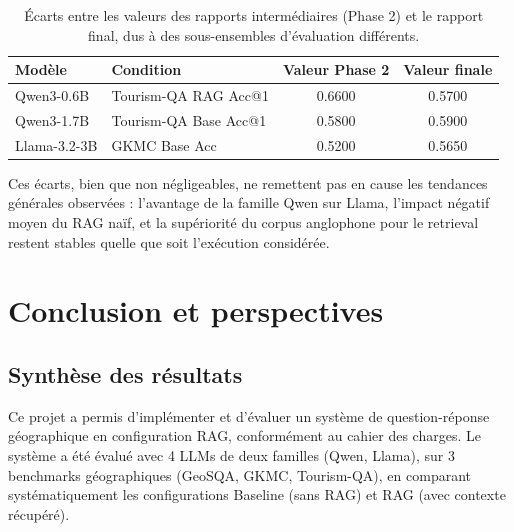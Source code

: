 \documentclass[12pt,a4paper]{article}
\begin{document}
\begin{table}[H]
\centering
\caption{Écarts entre les valeurs des rapports intermédiaires (Phase 2) et 
le rapport final, dus à des sous-ensembles d'évaluation différents.}
\label{tab:repro}
\begin{tabular}{llcc}
\toprule
\textbf{Modèle} & \textbf{Condition} & 
\textbf{Valeur Phase 2} & \textbf{Valeur finale} \\
\midrule
Qwen3-0.6B   & Tourism-QA RAG Acc@1  & 0.6600 & 0.5700 \\
Qwen3-1.7B   & Tourism-QA Base Acc@1 & 0.5800 & 0.5900 \\
Llama-3.2-3B & GKMC Base Acc         & 0.5200 & 0.5650 \\
\bottomrule
\end{tabular}
\end{table}

Ces écarts, bien que non négligeables, ne remettent pas en cause les tendances générales observées : l'avantage de la famille Qwen sur Llama, l'impact négatif moyen du RAG naïf, et la supériorité du corpus anglophone pour le retrieval restent stables quelle que soit l'exécution considérée.

\section{Conclusion et perspectives}
\label{sec:conclusion}

\subsection{Synth\`ese des r\'esultats}

Ce projet a permis d'impl\'ementer et d'\'evaluer un syst\`eme de question-r\'eponse g\'eographique en configuration RAG, conform\'ement au cahier des charges. Le syst\`eme a \'et\'e \'evalu\'e avec 4 LLMs de deux familles (Qwen, Llama), sur 3 benchmarks g\'eographiques (GeoSQA, GKMC, Tourism-QA), en comparant syst\'ematiquement les configurations Baseline (sans RAG) et RAG (avec contexte r\'ecup\'er\'e).
\end{document}
